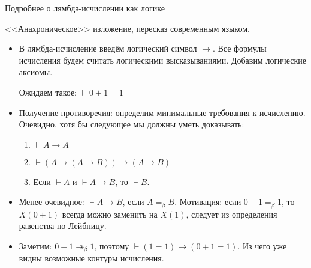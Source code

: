 \documentclass[aspectratio=169]{beamer}
\begin{document}
\begin{frame}{Подробнее о лямбда-исчислении как логике}

<<Анахроническое>> изложение, пересказ современным языком.
\begin{itemize}
\item В лямбда-исчисление введём логический символ $\rightarrow$. Все формулы исчисления будем считать
логическими высказываниями.
Добавим логические аксиомы.

Ожидаем такое: $\vdash 0+1 = 1$

\item Получение противоречия: определим минимальные требования к исчислению. 
Очевидно, хотя бы следующее мы должны уметь доказывать:

\begin{enumerate}
	\item $\vdash A \rightarrow A$
	\item $\vdash (A \rightarrow (A \rightarrow B)) \rightarrow (A \rightarrow B)$
	\item Если $\vdash A$ и $\vdash A \rightarrow B$, то $\vdash B$.
\end{enumerate}

\item Менее очевидное: $\vdash A \rightarrow B$, если $A =_{\beta} B$. Мотивация: если $0+1 =_\beta 1$, то
$X(0+1)$ всегда можно заменить на $X(1)$, следует из определения равенства по Лейбницу.

\item Заметим: $0+1 \twoheadrightarrow_\beta 1$, поэтому $\vdash (1 =1) \rightarrow (0+1 = 1)$.
Из чего уже видны возможные контуры исчисления.
\end{itemize}

\end{frame}
\end{document}
